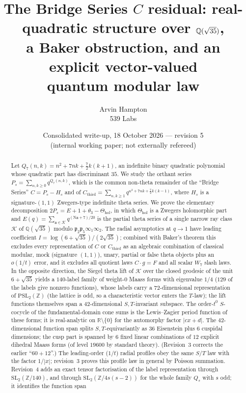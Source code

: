 \documentclass[11pt]{article}
\title{The Bridge Series $C$ residual: real-quadratic structure over $\Q(\sqrt{35})$,\\
a Baker obstruction, and an explicit vector-valued\\ quantum modular law}
\author{Arvin Hampton\\ \small 539 Labs}
\date{Consolidated write-up, 18 October 2026 --- revision 5\\ \small (internal working paper; not externally refereed)}
\theoremstyle{definition}
\newcommand{\Q}{\mathbb{Q}}
\newcommand{\Z}{\mathbb{Z}}
\newcommand{\R}{\mathbb{R}}
\newcommand{\K}{\mathcal{K}}
\newcommand{\fp}{\mathfrak{p}}
\newcommand{\fa}{\mathfrak{a}}
\newcommand{\Thol}{\Theta_{\mathrm{hol}}}
\newcommand{\Cthird}{C_{\mathrm{third}}}
\newcommand{\Nm}{\mathrm{N}}
\begin{document}
\maketitle

\begin{abstract}
Let $Q_7(n,k)=n^2+7nk+\tfrac72 k(k+1)$, an indefinite binary quadratic polynomial whose
quadratic part has discriminant $35$. We study the orthant series
$P_s=\sum_{n,k\ge 0}q^{Q_7(n,k)}$, which is the common non-theta remainder of the
``Bridge Series'' $C=P_s-H_s$ and of $\Cthird=\sum_{n,k\ge1}q^{n^2+7nk+\frac72k(k-1)}$,
where $H_s$ is a signature-$(1,1)$ Zwegers-type indefinite theta series.
We prove the elementary decomposition $2P_s=E+1+\theta_3-\Thol$, in which
$\Thol$ is a Zwegers holomorphic part and $E(q)=\sum_{\fa\in\K}q^{(\Nm\fa+7)/20}$ is the
partial theta series of a single narrow ray class $\K$ of $\Q(\sqrt{35})$ modulo $\fp_2\fp_5\infty_1\infty_2$.
The radial asymptotics at $q\to1$ have leading coefficient
$I=\log(6+\sqrt{35})/(2\sqrt{35})$; combined with Baker's theorem this excludes every
representation of $C$ or $\Cthird$ as an algebraic combination of classical modular, mock
(signature $(1,1)$), unary, partial or false theta objects plus an $o(1/t)$ error, and it excludes
all quotient laws $C\cdot g=F$ and all scalar $W_7$ slash laws. In the opposite direction,
the Siegel theta lift of $\K$ over the closed geodesic of the unit $6+\sqrt{35}$ yields a
$140$-label family of weight-$0$ Maass forms with eigenvalue $1/4$ ($129$ of the labels give nonzero functions), whose labels carry a $72$-dimensional
representation of $\mathrm{PSL}_2(\Z)$ (the lattice is odd, so a characteristic vector enters the $T$-law); the lift functions themselves span a
$42$-dimensional $S,T$-invariant subspace.
The order-$t^0$ $S$-cocycle of the fundamental-domain cone sums is the Lewis--Zagier period
function of these forms; it is real-analytic on $\R\setminus\{0\}$ for the automorphy factor
$|cx+d|$. The $42$-dimensional function span splits $S,T$-equivariantly as $36$ Eisenstein plus $6$ cuspidal dimensions; the cusp part is
spanned by $6$ fixed linear combinations of $12$ explicit dihedral Maass forms (of level $19600$ by standard theory). (Revision~3 corrects the
earlier ``$60+12$''.) The leading-order ($1/t$) radial profiles obey the same $S/T$ law with the factor $1/|x|$; revision~3 proves this
profile law in general by Poisson summation. Revision~4 adds an exact tensor factorisation of the label representation through
$\mathrm{SL}_2(\Z/140)$, and through $\mathrm{SL}_2(\Z/4s(s-2))$ for the whole family $Q_s$ with $s$ odd; it identifies the function span

\end{abstract}
\end{document}

